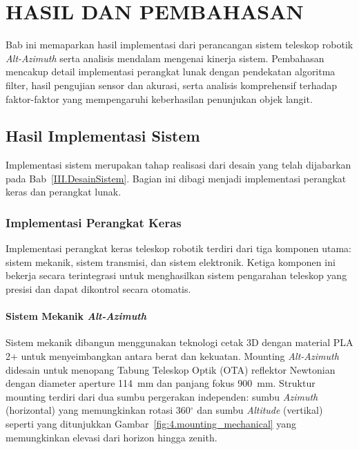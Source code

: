 \cleardoublepage
\chapter{HASIL DAN PEMBAHASAN} \label{Bab IV}

Bab ini memaparkan hasil implementasi dari perancangan sistem teleskop robotik \textit{Alt-Azimuth} serta analisis mendalam mengenai kinerja sistem. Pembahasan mencakup detail implementasi perangkat lunak dengan pendekatan algoritma filter, hasil pengujian sensor dan akurasi, serta analisis komprehensif terhadap faktor-faktor yang mempengaruhi keberhasilan penunjukan objek langit.

\section{Hasil Implementasi Sistem} \label{IV.Implementasi}

Implementasi sistem merupakan tahap realisasi dari desain yang telah dijabarkan pada Bab~\ref{III.DesainSistem}. Bagian ini dibagi menjadi implementasi perangkat keras dan perangkat lunak.

\subsection{Implementasi Perangkat Keras} \label{IV.Hardware}
Implementasi perangkat keras teleskop robotik terdiri dari tiga komponen utama: sistem mekanik, sistem transmisi, dan sistem elektronik. Ketiga komponen ini bekerja secara terintegrasi untuk menghasilkan sistem pengarahan teleskop yang presisi dan dapat dikontrol secara otomatis.

\subsubsection{Sistem Mekanik \textit{Alt-Azimuth}}
Sistem mekanik dibangun menggunakan teknologi cetak 3D dengan material PLA 2+ untuk menyeimbangkan antara berat dan kekuatan. Mounting \textit{Alt-Azimuth} didesain untuk menopang Tabung Teleskop Optik (OTA) reflektor Newtonian dengan diameter aperture 114~mm dan panjang fokus 900~mm. Struktur mounting terdiri dari dua sumbu pergerakan independen: sumbu \textit{Azimuth} (horizontal) yang memungkinkan rotasi 360$^{\circ}$ dan sumbu \textit{Altitude} (vertikal) seperti yang ditunjukkan Gambar~\ref{fig:4.mounting_mechanical} yang memungkinkan elevasi dari horizon hingga zenith. \par

